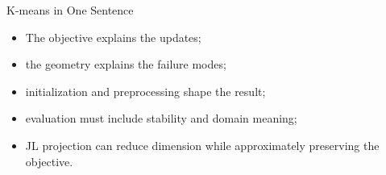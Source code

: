 \begin{frame}{K-means in One Sentence}
  \vspace{.55cm}
  \begin{itemize}\spaceditems
    \item The objective explains the updates;
    \item the geometry explains the failure modes;
    \item initialization and preprocessing shape the result;
    \item evaluation must include stability and domain meaning;
    \item JL projection can reduce dimension while approximately preserving the objective.
  \end{itemize}
\end{frame}


